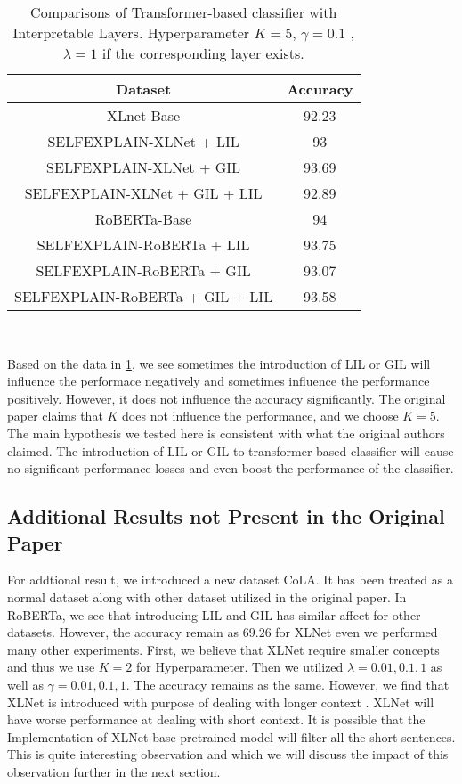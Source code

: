\documentclass{article}
\begin{document}
\begin{table}[h!]
  \centering
  \begin{tabular}{||c c||} 
   \hline
   Dataset & Accuracy  \\ [0.5ex] 
   \hline\hline
   XLnet-Base                     & 92.23 \\
   SELFEXPLAIN-XLNet + LIL        & 93 \\ 
   SELFEXPLAIN-XLNet + GIL        & 93.69 \\
   SELFEXPLAIN-XLNet + GIL + LIL  & 92.89 \\
   \hline\hline
   RoBERTa-Base                     & 94 \\
   SELFEXPLAIN-RoBERTa + LIL        & 93.75 \\ 
   SELFEXPLAIN-RoBERTa + GIL        & 93.07 \\ 
   SELFEXPLAIN-RoBERTa + GIL + LIL  & 93.58 \\ [0.5ex]
   \hline
  \end{tabular} \\ [1ex]
  \caption{Comparisons of Transformer-based classifier with Interpretable Layers. Hyperparameter $K = 5$, $\gamma = 0.1$ ,
  $\lambda = 1$ if the corresponding layer exists.}
  \label{table:3}
\end{table}

Based on the data in \ref{table:3}, we see sometimes the introduction of LIL or GIL will influence the performace 
negatively and sometimes influence the performance positively. However, it does not influence the accuracy
significantly. The original paper claims that $K$ does not influence the performance, and we choose $K = 5$. The main 
hypothesis we tested here is consistent with what the original authors claimed. The introduction of LIL or 
GIL to transformer-based classifier will cause no significant performance losses and even boost the 
performance of the classifier.

\subsection{Additional Results not Present in the Original Paper}

For addtional result, we introduced a new dataset CoLA. It has been treated as a normal dataset along with other 
dataset utilized in the original paper. In RoBERTa, we see that introducing LIL and GIL has similar affect for 
other datasets. However, the accuracy remain as $69.26$ for XLNet even we performed many other experiments. First,
we believe that XLNet require smaller concepts and thus we use $K=2$ for Hyperparameter. Then we utilized 
$\lambda = 0.01, 0.1, 1$ as well as $\gamma = 0.01, 0.1, 1$. The accuracy remains as the same. However, we find that 
XLNet is introduced with purpose of dealing with longer context \cite{DBLP:journals/corr/abs-1901-02860}. XLNet
will have worse performance at dealing with short context. It is possible that the Implementation of XLNet-base 
pretrained model will filter all the short sentences. This is quite interesting observation and which we will discuss 
the impact of this observation further in the next section.
\end{document}
